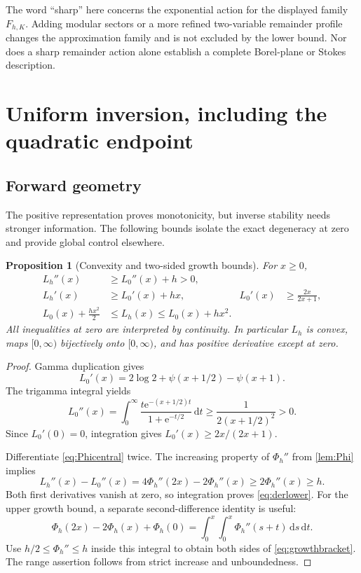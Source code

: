 \documentclass[11pt,a4paper]{article}
\numberwithin{equation}{section}
\newtheorem{proposition}[theorem]{Proposition}
\theoremstyle{definition}
\newcommand{\ee}{\mathrm e}
\newcommand{\dd}{\,\mathrm d}
\begin{document}
The word ``sharp'' here concerns the exponential action for the displayed family $F_{h,K}$. Adding modular sectors or a more refined two-variable remainder profile changes the approximation family and is not excluded by the lower bound. Nor does a sharp remainder action alone establish a complete Borel-plane or Stokes description.

\section{Uniform inversion, including the quadratic endpoint}
\label{sec:inverse}

\subsection{Forward geometry}
The positive representation proves monotonicity, but inverse stability needs stronger information. The following bounds isolate the exact degeneracy at zero and provide global control elsewhere.

\begin{proposition}[Convexity and two-sided growth bounds]
\label{prop:geometry}
For $x\ge0$,
\begin{align}
L_h''(x)&\ge L_0''(x)+h>0,\label{eq:convex}\\
L_h'(x)&\ge L_0'(x)+hx,
&L_0'(x)&\ge\frac{2x}{2x+1},\label{eq:derlower}\\
L_0(x)+\frac{hx^2}{2}&\le L_h(x)\le L_0(x)+hx^2.
\label{eq:growthbracket}
\end{align}
All inequalities at zero are interpreted by continuity. In particular $L_h$ is convex, maps $[0,\infty)$ bijectively onto $[0,\infty)$, and has positive derivative except at zero.
\end{proposition}
\begin{proof}
Gamma duplication gives
\[
L_0'(x)=2\log2+\psi(x+1/2)-\psi(x+1).
\]
The trigamma integral yields
\begin{equation}
L_0''(x)=\int_0^\infty
 \frac{t\ee^{-(x+1/2)t}}{1+\ee^{-t/2}}\dd t
 \ge\frac1{2(x+1/2)^2}>0.
\label{eq:coreconvex}
\end{equation}
Since $L_0'(0)=0$, integration gives $L_0'(x)\ge2x/(2x+1)$.

Differentiate \eqref{eq:Phicentral} twice. The increasing property of $\Phi_h''$ from \cref{lem:Phi} implies
\[
L_h''(x)-L_0''(x)=4\Phi_h''(2x)-2\Phi_h''(x)
 \ge2\Phi_h''(x)\ge h.
\]
Both first derivatives vanish at zero, so integration proves \eqref{eq:derlower}. For the upper growth bound, a separate second-difference identity is useful:
\[
\Phi_h(2x)-2\Phi_h(x)+\Phi_h(0)
 =\int_0^x\int_0^x\Phi_h''(s+t)\dd s\dd t.
\]
Use $h/2\le\Phi_h''\le h$ inside this integral to obtain both sides of \eqref{eq:growthbracket}. The range assertion follows from strict increase and unboundedness.
\end{proof}
\end{document}
